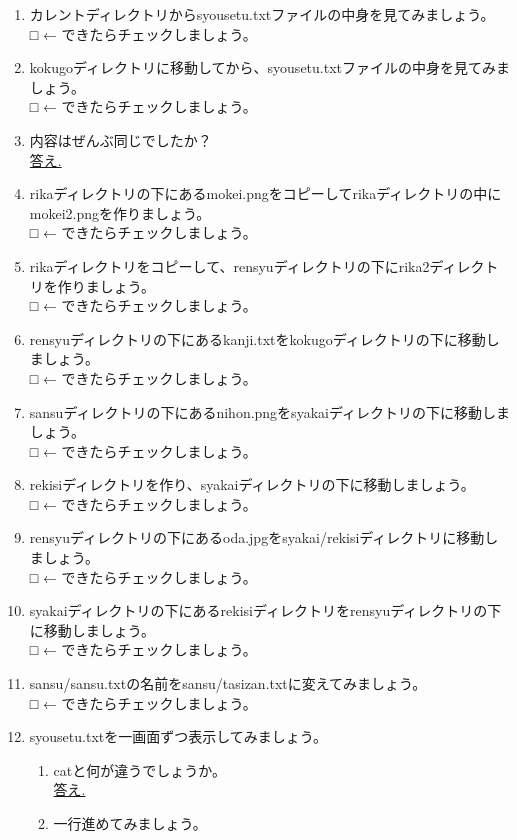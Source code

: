 \begin{tcolorbox}[title=\useOmetoi]
\begin{enumerate}
\item カレントディレクトリからsyousetu.txtファイルの中身を見てみましょう。\\
□ ← できたらチェックしましょう。
\item kokugoディレクトリに移動してから、syousetu.txtファイルの中身を見てみましょう。\\
□ ← できたらチェックしましょう。
\item 内容はぜんぶ同じでしたか？\\
\underline{答え.\hspace{0.8\linewidth}}
\item rikaディレクトリの下にあるmokei.pngをコピーしてrikaディレクトリの中にmokei2.pngを作りましょう。\\
□ ← できたらチェックしましょう。
\item rikaディレクトリをコピーして、rensyuディレクトリの下にrika2ディレクトリを作りましょう。\\
□ ← できたらチェックしましょう。
\item rensyuディレクトリの下にあるkanji.txtをkokugoディレクトリの下に移動しましょう。\\
□ ← できたらチェックしましょう。
\item sansuディレクトリの下にあるnihon.pngをsyakaiディレクトリの下に移動しましょう。\\
□ ← できたらチェックしましょう。
\item rekisiディレクトリを作り、syakaiディレクトリの下に移動しましょう。\\
□ ← できたらチェックしましょう。
\item rensyuディレクトリの下にあるoda.jpgをsyakai/rekisiディレクトリに移動しましょう。\\
□ ← できたらチェックしましょう。
\item syakaiディレクトリの下にあるrekisiディレクトリをrensyuディレクトリの下に移動しましょう。\\
□ ← できたらチェックしましょう。
\item sansu/sansu.txtの名前をsansu/tasizan.txtに変えてみましょう。\\
□ ← できたらチェックしましょう。
\item syousetu.txtを一画面ずつ表示してみましょう。
	\begin{enumerate}
	\item catと何が違うでしょうか。\\
	\underline{答え.\hspace{0.8\linewidth}}
	\item 一行進めてみましょう。

\end{enumerate}
\end{enumerate}
\end{tcolorbox}
